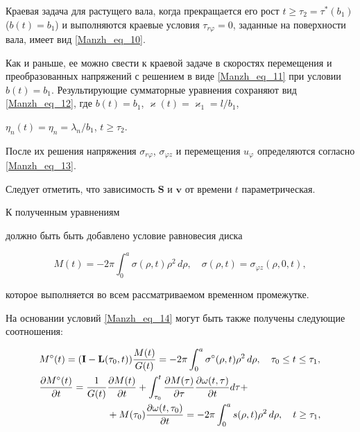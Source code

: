 Краевая задача для растущего вала, когда прекращается его рост \linebreak $t\geq\tau_2=\tau^*(b_1)$ ($b(t)=b_1$) и выполняются краевые условия $\tau_{r\varphi}=0$, заданные на поверхности вала, имеет вид \eqref{Manzh_eq_10}. 

Как и раньше, ее можно свести к краевой задаче в скоростях перемещения и преобразованных напряжений с решением в виде \eqref{Manzh_eq_11} при условии $b(t)=b_1$. Результирующие сумматорные уравнения сохраняют вид \eqref{Manzh_eq_12}, где $b(t)=b_1$, $\varkappa(t)=\varkappa_1=l/b_1$,

$\eta_n(t)=\eta_n=\lambda_n/b_1$, $t\geq\tau_2$. 

После их решения напряжения $\sigma_{r\varphi}$, $\sigma_{\varphi z}$ и перемещения $u_\varphi$ определяются согласно \eqref{Manzh_eq_13}. 

Следует отметить, что зависимость $\mathbf S$ и $\mathbf v$ от времени $t$ параметрическая.



К полученным уравнениям %

должно быть быть добавлено условие равновесия диска

\begin{equation}\label{Manzh_eq_14}%

  M(t)=-2\pi\int_0^a\sigma(\rho,t)\rho^2\,d\rho,\quad

  \sigma(\rho,t)=\sigma_{\varphi z}(\rho,0,t),

\end{equation}

которое выполняется во всем рассматриваемом временном промежутке.



На основании условий \eqref{Manzh_eq_14} могут быть также получены следующие соотношения:

\begin{align}

  &\label{Manzh_eq_18}%

    M^\circ(t)=(\mathbf I-\mathbf L(\tau_0,t))\frac{M(t)}{G(t)}

    =-2\pi\int_0^a\sigma^\circ(\rho,t)\rho^2\,d\rho,

  \quad      \tau_0\leq t\leq\tau_1,

\\

    &

    \frac{\partial M^{\circ}(t)}{\partial t}=\frac1{G(t)}\frac{\partial M(t)}{\partial t}+\int_{\tau_0}^t\frac{\partial M(\tau)}{\partial\tau}\frac{\partial\omega(t,\tau)}{\partial t}d\tau +

  \\

  &\label{Manzh_eq_19}%

    \hskip7em

    +M(\tau_0)\frac{\partial\omega(t,\tau_0)}{\partial t}

    =-2\pi\int_0^as(\rho,t)\rho^2\,d\rho,

  \quad      t\geq\tau_1,

\end{align}

